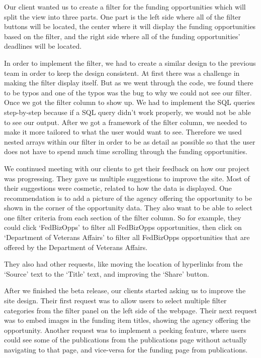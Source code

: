\documentclass[onecolumn]{IEEEtran}
\begin{document}
Our client wanted us to create a filter for the funding opportunities which will split the view into three parts. One part is the left side where all of the filter buttons will be located, the center where it will display the funding opportunities based on the filter, and the right side where all of the funding opportunities' deadlines will be located. 

In order to implement the filter, we had to create a similar design to the previous team in order to keep the design consistent. At first there was a challenge in making the filter display itself. But as we went through the code, we found there to be typos and one of the typos was the bug to why we could not see our filter. Once we got the filter column to show up. We had to implement the SQL queries step-by-step because if a SQL query didn't work properly, we would not be able to see our output. After we got a framework of the filter column, we needed to make it more tailored to what the user would want to see. Therefore we used nested arrays within our filter in order to be as detail as possible so that the user does not have to spend much time scrolling through the funding opportunities.

We continued meeting with our clients to get their feedback on how our project was progressing. They gave us multiple suggestions to improve the site. Most of their suggestions were cosmetic, related to how the data is displayed. One recommendation is to add a picture of the agency offering the opportunity to be shown in the corner of the opportunity data. They also want to be able to select one filter criteria from each section of the filter column. So for example, they could click `FedBizOpps' to filter all FedBizOpps opportunities, then click on `Department of Veterans Affairs' to filter all FedBizOpps opportunities that are offered by the Department of Veterans Affairs.

They also had other requests, like moving the location of hyperlinks from the `Source' text to the `Title' text, and improving the `Share' button.

After we finished the beta release, our clients started asking us to improve the site design. Their first request was to allow users to select multiple filter categories from the filter panel on the left side of the webpage. Their next request was to embed images in the funding item titles, showing the agency offering the opportunity. Another request was to implement a peeking feature, where users could see some of the publications from the publications page without actually navigating to that page, and vice-versa for the funding page from publications.
\end{document}
